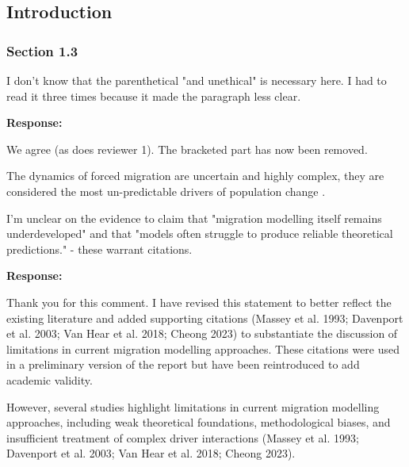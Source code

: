 \documentclass[11pt,a4paper]{article}
\begin{document}
\subsection*{Introduction}

\subsubsection*{Section 1.3}

\begin{reviewbox}
I don't know that the parenthetical "and unethical" is necessary here. I had to read it three times because it made the paragraph less clear.
\end{reviewbox}

\textbf{Response:}

We agree (as does reviewer 1). The bracketed part has now been removed.

\vspace{0.5cm}

\begin{updatebox}

The dynamics of forced migration are uncertain and highly complex, they are considered the most un-predictable
 drivers of population change    \citep{NRC2000}.
\end{updatebox}

\vspace{0.5cm}

\begin{reviewbox}
I'm unclear on the evidence to claim that "migration modelling itself remains underdeveloped" and that "models often struggle to produce reliable theoretical predictions." - these warrant citations.
\end{reviewbox}

\textbf{Response:}

Thank you for this comment. I have revised this statement to better reflect the existing literature and added supporting citations (Massey et al. 1993; Davenport et al. 2003; Van Hear et al. 2018; Cheong 2023) to substantiate the discussion of limitations in current migration modelling approaches.
These citations were used in a preliminary version of the report but have been reintroduced to add academic validity.

\vspace{0.5cm}

\begin{updatebox}
However, several studies highlight limitations in current migration modelling approaches, including weak theoretical foundations, methodological biases, and insufficient treatment of complex driver interactions (Massey et al. 1993; Davenport et al. 2003; Van Hear et al. 2018; Cheong 2023).
\end{updatebox}
\end{document}
